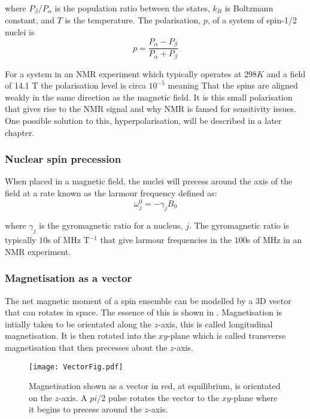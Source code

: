 where $P_{\beta}/P_{\alpha}$ is the population ratio between the states, $k_B$ is Boltzmann constant, and $T$ is the temperature. The polarisation, $p$, of a system of
spin-1/2 nuclei is
\begin{equation}\label{eqn:Polarisation}
  p = \frac{P_\alpha - P_\beta}{P_\alpha + P_\beta}
\end{equation}

For a system in an NMR experiment which typically operates at 298$K$ and
a field of 14.1 T the polarisation level is circa $10^{-5}$ meaning That the spins are aligned weakly
in the same direction as the magnetic field. It is this small polarisation that gives rise to the NMR
signal and why NMR is famed for sensitivity issues. One possible solution to this, hyperpolarisation, will be described in a later chapter.

\subsubsection{Nuclear spin precession}

When placed in a magnetic field, the nuclei will precess around the axis of the field at a rate known as the larmour frequency defined as:
\begin{equation}\label{eqn:larmour}
  \omega_j^0 = -\gamma_jB_0
\end{equation}

where $\gamma_j$ is the gyromagnetic ratio for a nucleus, $j$. The gyromagnetic ratio is
typically $10$s of MHz T$^{-1}$ that give larmour frequencies in the $100$s of MHz in an NMR
experiment.

\subsubsection{Magnetisation as a vector}

The net magnetic moment of a spin ensemble can be modelled by a 3D vector that can rotates in space. The essence of this is shown in . Magnetisation is intially taken to be orientated along the $z$-axis, this is called longitudinal magnetisation. It is then rotated into the $xy$-plane which is called transverse
magnetisation that then precesses about the $z$-axis.

\begin{figure}
  \begin{center}
  \texttt{[image: VectorFig.pdf]}
  \end{center}
  \caption{Magnetisation shown as a vector in red, at equilibrium, is orientated on the $z$-axis. A $pi$/2
  pulse rotates the vector to the $xy$-plane where it begins to precess around the $z$-axis.}
  \label{fig:VectorFig}
\end{figure}

